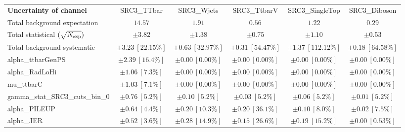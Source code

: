 
\begin{sidewaystable}
\begin{center}
\setlength{\tabcolsep}{0.0pc}
\begin{tabular*}{\textwidth}{@{\extracolsep{\fill}}lccccc}
\noalign{\smallskip}\hline\noalign{\smallskip}
{\bf Uncertainty of channel}                                    & SRC3\_TTbar            & SRC3\_Wjets            & SRC3\_TtbarV            & SRC3\_SingleTop            & SRC3\_Diboson            \\
\noalign{\smallskip}\hline\noalign{\smallskip}
Total background expectation             &  $14.57$        &  $1.91$        &  $0.56$        &  $1.22$        &  $0.29$       \\
\noalign{\smallskip}\hline\noalign{\smallskip}
Total statistical $(\sqrt{N_{\rm exp}})$              & $\pm 3.82$        & $\pm 1.38$        & $\pm 0.75$        & $\pm 1.10$        & $\pm 0.53$       \\
Total background systematic               & $\pm 3.23\ [22.15\%] $        & $\pm 0.63\ [32.97\%] $        & $\pm 0.31\ [54.47\%] $        & $\pm 1.37\ [112.12\%] $        & $\pm 0.18\ [64.58\%] $             \\
\noalign{\smallskip}\hline\noalign{\smallskip}
\noalign{\smallskip}\hline\noalign{\smallskip}
alpha\_ttbarGenPS         & $\pm 2.39\ [16.4\%] $          & $\pm 0.00\ [0.00\%] $          & $\pm 0.00\ [0.00\%] $          & $\pm 0.00\ [0.00\%] $          & $\pm 0.00\ [0.00\%] $       \\
alpha\_RadLoHi         & $\pm 1.06\ [7.3\%] $          & $\pm 0.00\ [0.00\%] $          & $\pm 0.00\ [0.00\%] $          & $\pm 0.00\ [0.00\%] $          & $\pm 0.00\ [0.00\%] $       \\
mu\_ttbarC         & $\pm 1.03\ [7.1\%] $          & $\pm 0.00\ [0.00\%] $          & $\pm 0.00\ [0.00\%] $          & $\pm 0.00\ [0.00\%] $          & $\pm 0.00\ [0.00\%] $       \\
gamma\_stat\_SRC3\_cuts\_bin\_0         & $\pm 0.76\ [5.2\%] $          & $\pm 0.10\ [5.2\%] $          & $\pm 0.03\ [5.2\%] $          & $\pm 0.06\ [5.2\%] $          & $\pm 0.01\ [5.2\%] $       \\
alpha\_PILEUP         & $\pm 0.64\ [4.4\%] $          & $\pm 0.20\ [10.3\%] $          & $\pm 0.20\ [36.1\%] $          & $\pm 0.10\ [8.0\%] $          & $\pm 0.02\ [7.5\%] $       \\
alpha\_JER         & $\pm 0.52\ [3.6\%] $          & $\pm 0.28\ [14.9\%] $          & $\pm 0.15\ [26.6\%] $          & $\pm 0.19\ [15.2\%] $          & $\pm 0.00\ [0.53\%] $       \\

\end{tabular*}
\end{center}
\end{sidewaystable}
